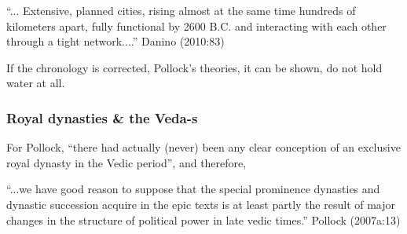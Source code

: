 \begin{myquote}
“... Extensive, planned cities, rising almost at the same time hundreds of kilometers apart, fully functional by 2600 B.C. and interacting with each other through a tight network....” \hfill Danino (2010:83)
\end{myquote}

If the chronology is corrected, Pollock’s theories, it can be shown, do not hold water at all.\\[-25pt]

\subsubsection{Royal dynasties \& the Veda-s}\label{sec1.1.2.3}

For Pollock, “there had actually (never) been any clear conception of an exclusive royal dynasty in the Vedic period”, and therefore, 

\begin{myquote}
“...we have good reason to suppose that the special prominence dynasties and dynastic succession acquire in the epic texts is at least partly the result of major changes in the structure of political power in late vedic times.”
\hfill Pollock (2007a:13)
\end{myquote}

